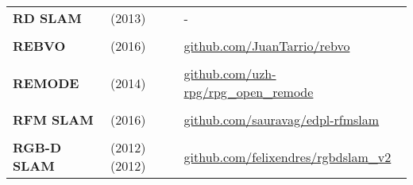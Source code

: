 \documentclass[a4paper,12pt]{scrartcl}
\begin{document}
{\begin{longtable}{l|l|l}
    \textbf{RD SLAM}       & \cite{Tan2013a} (2013)                                                                      & -                                                                                                                            \\
                           &                                                                                             &                                                                                                                              \\ [-3mm]
    \textbf{REBVO}         & \cite{Tarrio2016} (2016)                                                                    & {\href{https://github.com/JuanTarrio/rebvo}{github.com/JuanTarrio/rebvo}}                                                    \\
                           &                                                                                             &                                                                                                                              \\ [-3mm]
    \textbf{REMODE}        & \cite{Pizzoli2014} (2014)                                                                   & {\href{https://github.com/uzh-rpg/rpg_open_remode}{github.com/uzh-rpg/rpg\_open\_remode}}                                    \\
                           &                                                                                             &                                                                                                                              \\ [-3mm]
    \textbf{RFM SLAM}      & \cite{Agarwal2016} (2016)                                                                   & {\href{https://github.com/sauravag/edpl-rfmslam}{github.com/sauravag/edpl-rfmslam}}                                          \\
                           &                                                                                             &                                                                                                                              \\ [-3mm]
    \textbf{RGB-D SLAM}    & \cite{Endres2012} (2012) \cite{Endres2012a} (2012)                                          & {\href{https://github.com/felixendres/rgbdslam_v2}{github.com/felixendres/rgbdslam\_v2}}                                     \\

\end{longtable}}
\end{document}
